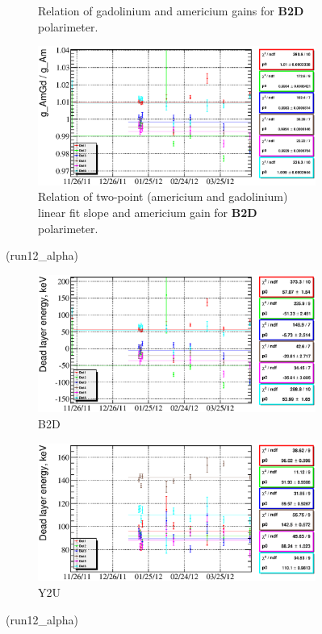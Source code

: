 \documentclass[a4paper,12pt]{article}
\begin{document}
\begin{figure}[htb]
\begin{subfigure}[t]{0.49\textwidth}
\caption{Relation of gadolinium and americium gains for \textbf{B2D} polarimeter.}
\end{subfigure}
%
\hfill
%
\begin{subfigure}[t]{0.49\textwidth}
\includegraphics[width=\textwidth]{gfx/run12_alpha/B2D/c_chAmGdGain_over_AmGain_by_day_B2D.eps}
\caption{Relation of two-point (americium and gadolinium) linear fit slope and americium gain
for \textbf{B2D} polarimeter.}
\end{subfigure}
\caption{\gainrealationslabel{} (run12\_alpha)}
\end{figure}

\begin{figure}[htb]
\begin{subfigure}[t]{0.49\textwidth}
\includegraphics[width=\textwidth]{gfx/run12_alpha/B2D/c_chDeadLayerEnergy_by_day_B2D.eps}
\caption{B2D}
\end{subfigure}
%
\hfill
%
\begin{subfigure}[t]{0.49\textwidth}
\includegraphics[width=\textwidth]{gfx/run12_alpha/Y2U/c_chDeadLayerEnergy_by_day_Y2U.eps}
\caption{Y2U}
\end{subfigure}
\caption{\edllabellabel{} (run12\_alpha)}
\end{figure}
\end{document}
